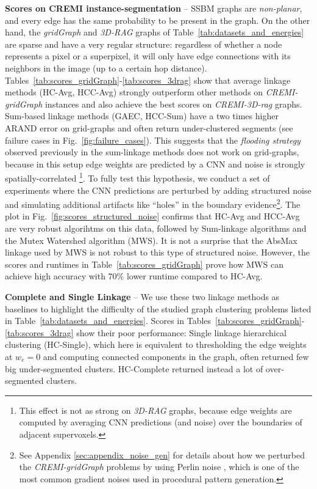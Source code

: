 \textbf{Scores on CREMI instance-segmentation} -- 
SSBM graphs are \emph{non-planar}, and every edge has the same probability to be present in the graph. On the other hand, the \emph{gridGraph} and \emph{3D-RAG} graphs of Table~\ref{tab:datasets_and_energies} are sparse and have a very regular structure: regardless of whether a node represents a pixel or a superpixel, it will only have edge connections with its neighbors in the image (up to a certain hop distance). 
Tables~\ref{tab:scores_gridGraph}-\ref{tab:scores_3drag} show that average linkage methods (HC-Avg, HCC-Avg) strongly outperform other methods on \emph{CREMI-gridGraph} instances and also achieve the best scores on \emph{CREMI-3D-rag} graphs. Sum-based linkage methods (GAEC, HCC-Sum) have a two times higher ARAND error on grid-graphs and often return under-clustered segments (see failure cases in Fig.~\ref{fig:failure_cases}). This suggests that the \emph{flooding strategy} observed previously in the sum-linkage methods does not work on grid-graphs, because in this setup edge weights are predicted by a CNN and noise is strongly spatially-correlated \footnote{This effect is not as strong on \emph{3D-RAG} graphs, because edge weights are computed by averaging CNN predictions (and noise) over the boundaries of adjacent supervoxels.}.
To fully test this hypothesis, we conduct a set of experiments where the CNN predictions are perturbed by adding structured noise and simulating additional artifacts like ``holes'' in the boundary evidence\footnote{See Appendix \ref{sec:appendix_noise_gen} for details about how we perturbed the \emph{CREMI-gridGraph} problems by using Perlin noise \cite{perlin2001noise,perlin1985image}, which is one of the most common gradient noises used in procedural pattern generation.}. 
The plot in Fig.~\ref{fig:scores_structured_noise} confirms that HC-Avg and HCC-Avg are very robust algorihtms on this data, followed by Sum-linkage algorithms and the Mutex Watershed algorithm (MWS). It is not a surprise that the AbsMax linkage used by MWS is not robust to this type of structured noise. However, the scores and runtimes in Table~\ref{tab:scores_gridGraph} prove how MWS can achieve high accuracy with 70\% lower runtime compared to HC-Avg. 

\textbf{Complete and Single Linkage} -- We use these two linkage methods as baselines to highlight the difficulty of the studied graph clustering problems listed in Table~\ref{tab:datasets_and_energies}. Scores in Tables~\ref{tab:scores_gridGraph}-\ref{tab:scores_3drag} show their poor performance: Single linkage hierarchical clustering (HC-Single), which here is equivalent to thresholding the edge weights at $w_e=0$ and computing connected components in the graph, often returned few big under-segmented clusters. HC-Complete returned instead a lot of over-segmented clusters. 

